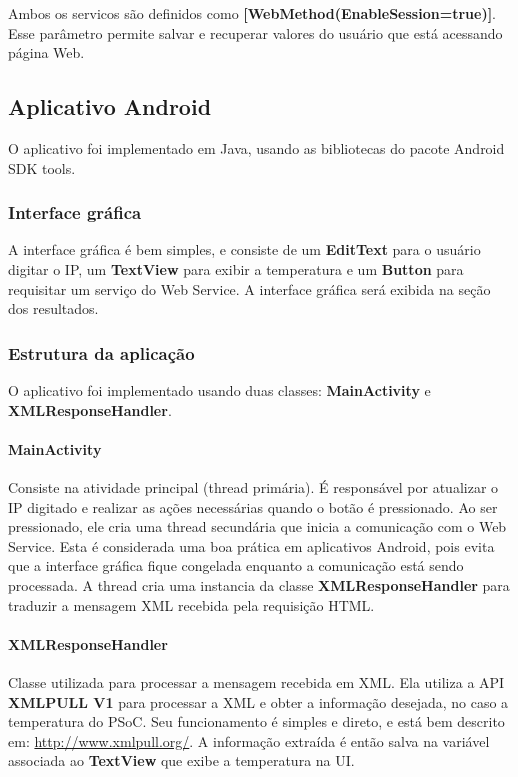 \documentclass[a4paper,12pt,titlepage]{article}
\begin{document}
		  Ambos os servicos são definidos como \textbf{[WebMethod(EnableSession=true)]}. Esse parâmetro permite salvar e recuperar valores do usuário que está acessando página Web. 
	
	\subsection{Aplicativo Android}	
			O aplicativo foi implementado em Java, usando as bibliotecas do pacote Android SDK tools.
			\subsubsection{Interface gráfica}
				A interface gráfica é bem simples, e consiste de um \textbf{EditText} para o usuário digitar o IP, um \textbf{TextView} para exibir a temperatura e um \textbf{Button} para requisitar um serviço do Web Service. A interface gráfica será exibida na seção dos resultados.
				
			\subsubsection{Estrutura da aplicação}
			O aplicativo foi implementado usando duas classes: \textbf{MainActivity} e \textbf{XMLResponseHandler}. 
			\paragraph{MainActivity} Consiste na atividade principal (thread primária). É responsável por atualizar o IP digitado e realizar as ações necessárias quando o botão é pressionado. Ao ser pressionado, ele cria uma thread secundária que inicia a comunicação com o Web Service. Esta é considerada uma boa prática em aplicativos Android, pois evita que a interface gráfica fique congelada enquanto a comunicação está sendo processada. A thread cria uma instancia da classe \textbf{XMLResponseHandler} para traduzir a mensagem XML recebida pela requisição HTML.
			
			\paragraph{XMLResponseHandler} Classe utilizada para processar a mensagem recebida em XML. Ela utiliza a API \textbf{XMLPULL V1} para processar a XML e obter a informação desejada, no caso a temperatura do PSoC. Seu funcionamento é simples e direto, e está bem descrito em:  \url{http://www.xmlpull.org/}. 
			A informação extraída é então salva na variável associada ao \textbf{TextView} que exibe a temperatura na UI.
				
\end{document}
